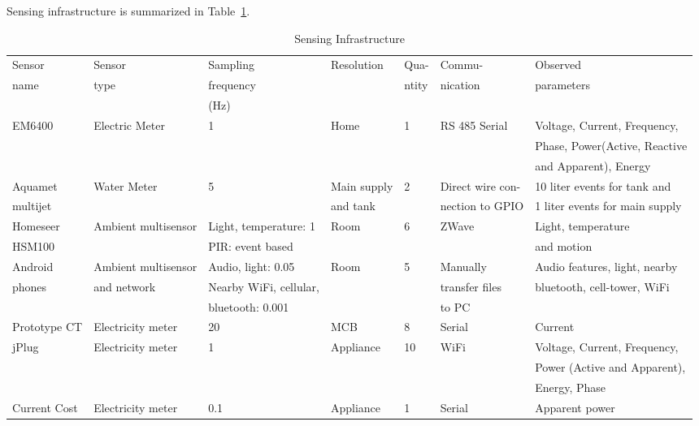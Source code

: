\documentclass[10pt]{sensys-proc}
\newcommand{\tabref}[1]{Table~\ref{#1}}
\begin{document}
\noindent Sensing infrastructure is summarized in \tabref{tab:sensing}.


\begin{table}
\caption{Sensing Infrastructure}

\label{tab:sensing}
\tabcolsep=0.015cm
\begin{tabular}{|l|l|l|l|l|l|l|}
\hline
Sensor&Sensor&Sampling&Resolution&Qua-&Commu-&Observed\\
name&type&frequency&&ntity&nication&parameters\\
&&(Hz)&&&&\\
\hline

EM6400&Electric Meter&1&Home&1&RS 485 Serial&Voltage, Current, Frequency,\\ 
&&&&&&Phase, Power(Active, Reactive \\ 
&&&&&&and Apparent), Energy\\ \hline
Aquamet &Water Meter&5&Main supply&2&Direct wire con-&10 liter events for tank and \\ 
multijet&&& and tank&&nection to GPIO&1 liter events for main supply\\ \hline
Homeseer &Ambient multisensor&Light, temperature: 1&Room &6&ZWave&Light, temperature\\ 
     HSM100           &&PIR: event based&&&& and motion\\ \hline
Android&Ambient multisensor&Audio, light: 0.05&Room&5&Manually&Audio features, light, nearby \\ 
phones&and network&Nearby WiFi, cellular,&&&transfer files&bluetooth, cell-tower, WiFi\\ 
&& bluetooth: 0.001&&&to PC&\\ \hline
Prototype CT&Electricity meter&20&MCB&8&Serial&Current \\\hline
jPlug&Electricity meter & 1 &Appliance&10&WiFi&Voltage, Current, Frequency,\\ 
&&&&&&Power (Active and Apparent),\\
&&&&&& Energy, Phase\\ \hline	
Current Cost&Electricity meter&0.1&Appliance&1&Serial&Apparent power\\ \hline


\end{tabular}


\end{table}
\end{document}
